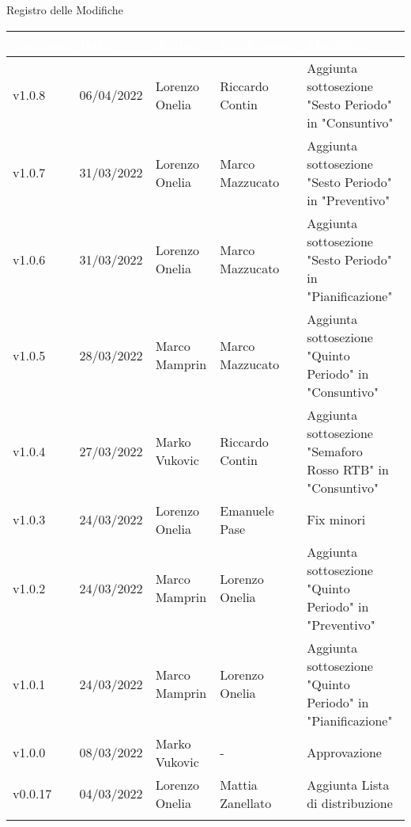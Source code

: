 \begin{center}
  \huge{Registro delle Modifiche}
\end{center}
\renewcommand\arraystretch{1,5}
{\centering
\begin{longtable}{|C{1.8cm}|C{2.1cm}|C{2cm}|C{2.4cm}|L{4.4cm}|}
  \hline
  \textcolor[HTML]{FFFFFF}{\textbf{Versione}} & \textcolor[HTML]{FFFFFF}{\textbf{Data}} & \textcolor[HTML]{FFFFFF}{\textbf{Autore}}  & \textcolor[HTML]{FFFFFF}{\textbf{Verificatore}} & \textcolor[HTML]{FFFFFF}{\textbf{Modifica}}    \\ \hline
  v1.0.8        & 06/04/2022    & Lorenzo Onelia   &  Riccardo Contin    & Aggiunta sottosezione "Sesto Periodo" in "Consuntivo" \\ \hline
  v1.0.7        & 31/03/2022    & Lorenzo Onelia   &  Marco Mazzucato    & Aggiunta sottosezione "Sesto Periodo" in "Preventivo" \\ \hline
  v1.0.6        & 31/03/2022    & Lorenzo Onelia   &   Marco Mazzucato   & Aggiunta sottosezione "Sesto Periodo" in "Pianificazione" \\ \hline
  v1.0.5        & 28/03/2022    & Marco Mamprin   &  Marco Mazzucato    & Aggiunta sottosezione "Quinto Periodo" in "Consuntivo" \\ \hline
  v1.0.4        & 27/03/2022    & Marko Vukovic   &  Riccardo Contin    & Aggiunta sottosezione "Semaforo Rosso RTB" in "Consuntivo" \\ \hline
  v1.0.3        & 24/03/2022    & Lorenzo Onelia  & Emanuele Pase    & Fix minori                  \\ \hline
  v1.0.2        & 24/03/2022    & Marco Mamprin   &  Lorenzo Onelia    & Aggiunta sottosezione "Quinto Periodo" in "Preventivo" \\ \hline
  v1.0.1        & 24/03/2022    & Marco Mamprin   &  Lorenzo Onelia    & Aggiunta sottosezione "Quinto Periodo" in "Pianificazione" \\ \hline
  v1.0.0        & 08/03/2022    & Marko Vukovic   &  -                 & Approvazione \\ \hline
  v0.0.17       & 04/03/2022    & Lorenzo Onelia  & Mattia Zanellato     & Aggiunta Lista di distribuzione                  \\ \hline

\end{longtable}}
